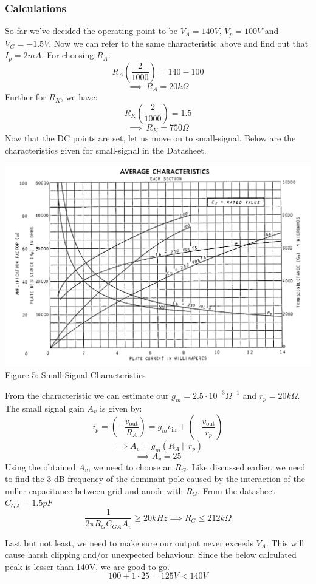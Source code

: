 \documentclass[11pt]{article}
\newcommand{\tab}{\hspace*{6mm}}
\begin{document}
\subsubsection{Calculations}
\tab So far we've decided the operating point to be $V_A = 140V$, $V_p = 100V$ and $V_G = -1.5V$. Now we can refer to the same characteristic above and find out that $I_p = 2 mA$. For choosing $R_A$:
\[R_A\left(\frac{2}{1000}\right) = 140 - 100\] \[\implies \ \boxed{R_A = 20 k \Omega}\] 
Further for $R_K$, we have:
\[R_K\left(\frac{2}{1000}\right) = 1.5\] \[\implies \ \boxed{R_K = 750 \Omega}\]
\newpage
\tab Now that the DC points are set, let us move on to small-signal. Below are the characteristics given for small-signal in the Datasheet.
\begin{center}
    \includegraphics[width=\textwidth]{Documentation LaTeX/smallsignal.png}\\
    \small{Figure 5: Small-Signal Characteristics}
\end{center}
\tab From the characteristic we can estimate our $g_m = 2.5 \cdot 10^{-3} \Omega^{-1}$ and $r_p = 20 k \Omega$. The small signal gain $A_v$ is given by: \[i_p = \left(-\frac{v_{\text{out}}}{R_A}\right) = g_m v_\text{in} + \left(-\frac{v_{\text{out}}}{r_p}\right)\]
\[\implies A_v = g_m\left(R_A \ || \ r_p\right)\]
\[\implies \boxed{A_v = 25}\]
\tab Using the obtained $A_v$, we need to choose an $R_G$. Like discussed earlier, we need to find the 3-dB frequency of the dominant pole caused by the interaction of the miller capacitance between grid and anode with $R_G$. From the datasheet $C_{GA} = 1.5 pF$
\[\frac{1}{2\pi R_G C_{GA} A_v} \geq 20kHz \implies \boxed{R_G \leq 212 k \Omega}\]

\tab Last but not least, we need to make sure our output never exceeds $V_A$. This will cause harsh clipping and/or unexpected behaviour. Since the below calculated peak is lesser than 140V, we are good to go. \[\boxed{100 + 1 \cdot 25 = 125V < 140V}\]
\end{document}

